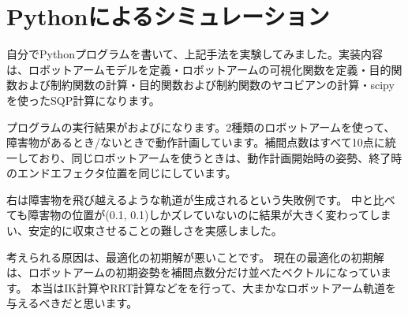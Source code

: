 \clearpage
\section{Pythonによるシミュレーション}
自分でPythonプログラムを書いて、上記手法を実験してみました。実装内容は、ロボットアームモデルを定義・ロボットアームの可視化関数を定義・目的関数および制約関数の計算・目的関数および制約関数のヤコビアンの計算・scipyを使ったSQP計算になります。

プログラムの実行結果がおよびになります。2種類のロボットアームを使って、障害物があるとき/ないときで動作計画しています。補間点数はすべて10点に統一しており、同じロボットアームを使うときは、動作計画開始時の姿勢、終了時のエンドエフェクタ位置を同じにしています。

右は障害物を飛び越えるような軌道が生成されるという失敗例です。
中と比べても障害物の位置が(0.1, 0.1)しかズレていないのに結果が大きく変わってしまい、安定的に収束させることの難しさを実感しました。

考えられる原因は、最適化の初期解が悪いことです。
現在の最適化の初期解は、ロボットアームの初期姿勢を補間点数分だけ並べたベクトルになっています。
本当はIK計算やRRT計算などをを行って、大まかなロボットアーム軌道を与えるべきだと思います。

